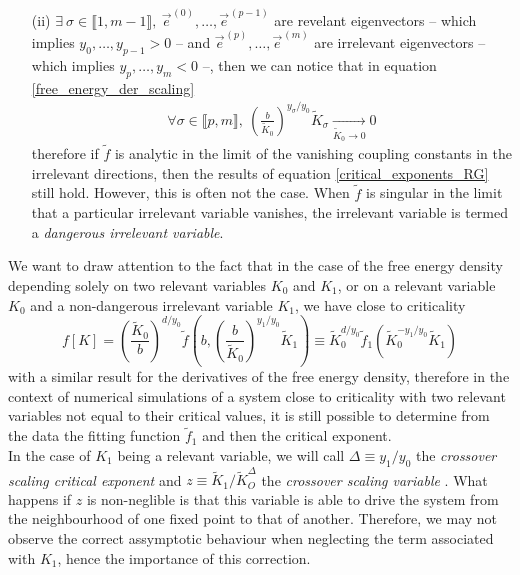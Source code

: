 \documentclass[class=report, float=false, crop=false]{standalone}
\begin{document}
\begin{itemize}
\item[(ii)] $\exists~ \sigma \in \llbracket1,m-1\rrbracket,~ \vec{e}^{\hspace{1pt}(0)},\ldots,\vec{e}^{\hspace{1pt}(p-1)}$ are revelant eigenvectors -- which implies $y_0,\ldots,y_{p-1}>0$ -- and $\vec{e}^{\hspace{1pt}(p)},\ldots,\vec{e}^{\hspace{1pt}(m)}$ are irrelevant eigenvectors -- which implies $y_p,\ldots,y_m<0$ --, then we can notice that in equation \ref{free_energy_der_scaling}
\begin{align*}
\forall \sigma \in \llbracket p,m\rrbracket,~ \left(\frac{b}{\tilde{K}_0}\right)^{y_{\sigma}/y_0}\tilde{K}_{\sigma} \xrightarrow[\tilde{K}_0\rightarrow0]{} 0
\end{align*}
therefore if $\tilde{f}$ is analytic in the limit of the vanishing coupling constants in the irrelevant directions, then the results of equation \ref{critical_exponents_RG} still hold. However, this is often not the case. When $\tilde{f}$ is singular in the limit that a particular irrelevant variable vanishes, the irrelevant variable is termed a \textit{dangerous irrelevant variable}.\\
\end{itemize}

We want to draw attention to the fact that in the case of the free energy density depending solely on two relevant variables $K_0$ and $K_1$, or on a relevant variable $K_0$ and a non-dangerous irrelevant variable $K_1$, we have close to criticality
\begin{equation}
f[K] = \left(\frac{\tilde{K}_0}{b}\right)^{d/y_0}\tilde{f}\left(b,\left(\frac{b}{\tilde{K}_0}\right)^{y_1/y_0}\tilde{K}_1\right) \equiv \tilde{K}_0^{d/y_0}\tilde{f}_1\left(\tilde{K}_0^{-y_1/y_0}\tilde{K}_1\right)
\label{fitting_function}
\end{equation}
with a similar result for the derivatives of the free energy density, therefore in the context of numerical simulations of a system close to criticality with two relevant variables not equal to their critical values, it is still possible to determine from the data the fitting function $\tilde{f}_1$ and then the critical exponent.\\

In the case of $K_1$ being a relevant variable, we will call $\Delta \equiv y_1/y_0$ the \textit{crossover scaling critical exponent} and $z \equiv \tilde{K}_1/\tilde{K}_O^{\Delta}$ the \textit{crossover scaling variable} \cite{PRL99.178001}. What happens if $z$ is non-neglible is that this variable is able to drive the system from the neighbourhood of one fixed point to that of another. Therefore, we may not observe the correct assymptotic behaviour when neglecting the term associated with $K_1$, hence the importance of this correction.\\
\end{document}
